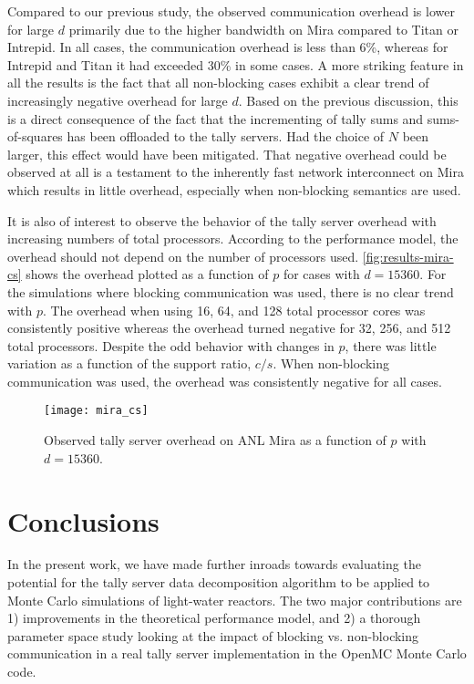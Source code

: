 \documentclass{snamc2013}
\begin{document}
Compared to our previous study, the observed communication overhead is lower for
large $d$ primarily due to the higher bandwidth on Mira compared to Titan or
Intrepid. In all cases, the communication overhead is less than 6\%, whereas for
Intrepid and Titan it had exceeded 30\% in some cases. A more striking feature
in all the results is the fact that all non-blocking cases exhibit a clear trend
of increasingly negative overhead for large $d$. Based on the previous
discussion, this is a direct consequence of the fact that the incrementing of
tally sums and sums-of-squares has been offloaded to the tally servers. Had the
choice of $N$ been larger, this effect would have been mitigated. That negative
overhead could be observed at all is a testament to the inherently fast network
interconnect on Mira which results in little overhead, especially when
non-blocking semantics are used.

It is also of interest to observe the behavior of the tally server overhead with
increasing numbers of total processors. According to the performance model, the
overhead should not depend on the number of processors
used. \autoref{fig:results-mira-cs} shows the overhead plotted as a function of
$p$ for cases with $d=15360$. For the simulations where blocking communication
was used, there is no clear trend with $p$. The overhead when using 16, 64, and
128 total processor cores was consistently positive whereas the overhead turned
negative for 32, 256, and 512 total processors. Despite the odd behavior with
changes in $p$, there was little variation as a function of the support ratio,
$c/s$. When non-blocking communication was used, the overhead was consistently
negative for all cases.
\begin{figure}[htb]
  \centering
  \texttt{[image: mira\_cs]}
  \caption{Observed tally server overhead on ANL Mira as a function of $p$ with
    $d=15360$.}
  \label{fig:results-mira-cs}
\end{figure}

\section{Conclusions}

In the present work, we have made further inroads towards evaluating the
potential for the tally server data decomposition algorithm to be applied to
Monte Carlo simulations of light-water reactors. The two major contributions are
1) improvements in the theoretical performance model, and 2) a thorough
parameter space study looking at the impact of blocking vs. non-blocking
communication in a real tally server implementation in the OpenMC Monte Carlo
code.
\end{document}
